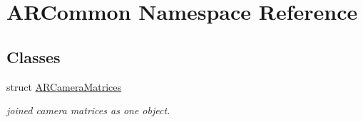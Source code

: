 \hypertarget{namespace_a_r_common}{}\section{A\+R\+Common Namespace Reference}
\label{namespace_a_r_common}
\subsection*{Classes}
\begin{DoxyCompactItemize}
\item 
struct \hyperlink{struct_a_r_common_1_1_a_r_camera_matrices}{A\+R\+Camera\+Matrices}
\begin{DoxyCompactList}\small\item\em joined camera matrices as one object. \end{DoxyCompactList}\end{DoxyCompactItemize}
